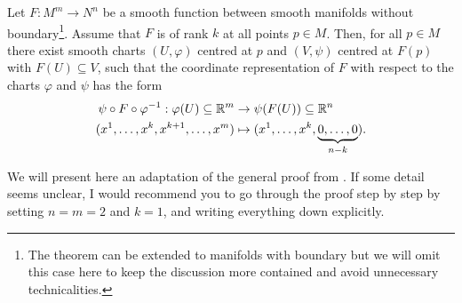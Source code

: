 \begin{theorem}\label{thm:rank}
  Let $F : M^m \to N^n$ be a smooth function between smooth manifolds without boundary\footnote{The theorem can be extended to manifolds with boundary but we will omit this case here to keep the discussion more contained and avoid unnecessary technicalities.}.
  Assume that $F$ is of rank $k$ at all points $p\in M$.
  Then, for all $p\in M$ there exist smooth charts $(U, \varphi)$ centred at $p$ and $(V, \psi)$ centred at $F(p)$ with $F(U)\subseteq V$, such that the coordinate representation of $F$ with respect to the charts $\varphi$ and $\psi$ has the form
  \begin{align}
    \psi \circ F \circ \varphi^{-1} : \varphi(U) \subseteq \R^m &\to \psi(F(U)) \subseteq \R^n \\
    (x^1, \ldots, x^k, x^{k+1}, \ldots, x^m) &\mapsto (x^1, \ldots, x^k, \LaTeXunderbrace{0, \ldots, 0}_{n-k}).
  \end{align}
\end{theorem}

We will present here an adaptation of the general proof from \cite[Theorem 4.12]{book:lee}.
If some detail seems unclear, I would recommend you to go through the proof step by step by setting $n=m=2$ and $k=1$, and writing everything down explicitly.

